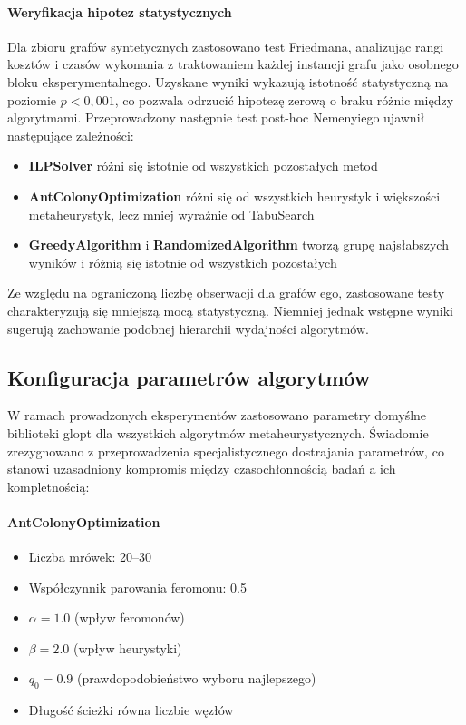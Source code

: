 \paragraph{Weryfikacja hipotez statystycznych}

Dla zbioru grafów syntetycznych zastosowano test Friedmana, analizując rangi kosztów i czasów wykonania z traktowaniem każdej instancji grafu jako osobnego bloku eksperymentalnego. Uzyskane wyniki wykazują istotność statystyczną na poziomie $p < 0{,}001$, co pozwala odrzucić hipotezę zerową o braku różnic między algorytmami. Przeprowadzony następnie test post-hoc Nemenyiego ujawnił następujące zależności:

\begin{itemize}
\item \textbf{ILPSolver} różni się istotnie od wszystkich pozostałych metod
\item \textbf{AntColonyOptimization} różni się od wszystkich heurystyk i większości metaheurystyk, lecz mniej wyraźnie od TabuSearch
\item \textbf{GreedyAlgorithm} i \textbf{RandomizedAlgorithm} tworzą grupę najsłabszych wyników i różnią się istotnie od wszystkich pozostałych
\end{itemize}

Ze względu na ograniczoną liczbę obserwacji dla grafów ego, zastosowane testy charakteryzują się mniejszą mocą statystyczną. Niemniej jednak wstępne wyniki sugerują zachowanie podobnej hierarchii wydajności algorytmów.

\subsection{Konfiguracja parametrów algorytmów}

W ramach prowadzonych eksperymentów zastosowano parametry domyślne biblioteki glopt dla wszystkich algorytmów metaheurystycznych. Świadomie zrezygnowano z przeprowadzenia specjalistycznego dostrajania parametrów, co stanowi uzasadniony kompromis między czasochłonnością badań a ich kompletnością:

\paragraph{AntColonyOptimization}
\begin{itemize}
\item Liczba mrówek: 20--30
\item Współczynnik parowania feromonu: 0.5
\item $\alpha = 1.0$ (wpływ feromonów)
\item $\beta = 2.0$ (wpływ heurystyki)
\item $q_0 = 0.9$ (prawdopodobieństwo wyboru najlepszego)
\item Długość ścieżki równa liczbie węzłów
\end{itemize}

